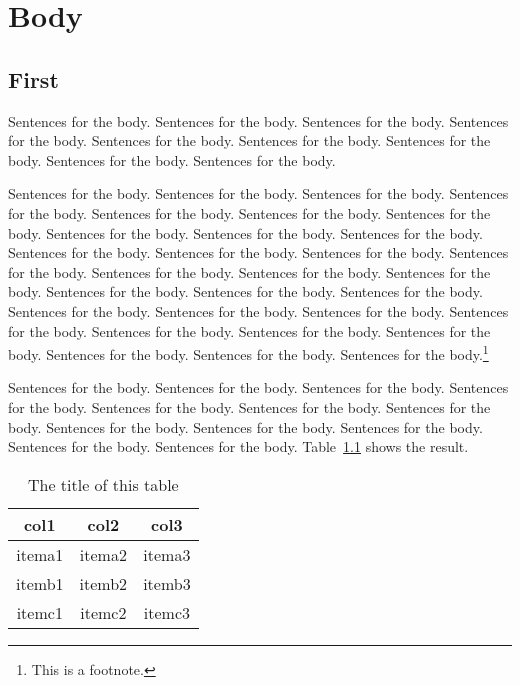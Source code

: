 \chapter{Body}

\section{First}

Sentences for the body.  Sentences for the body.  Sentences for the body.
Sentences for the body.  Sentences for the body.  Sentences for the body.
Sentences for the body.  Sentences for the body.  Sentences for the body.

Sentences for the body.  Sentences for the body.  Sentences for the body.
Sentences for the body.  Sentences for the body.  Sentences for the body.
Sentences for the body.  Sentences for the body.  Sentences for the body.
Sentences for the body.  Sentences for the body.  Sentences for the body.
Sentences for the body.  Sentences for the body.  Sentences for the body.
Sentences for the body.  Sentences for the body.  Sentences for the body.
Sentences for the body.  Sentences for the body.  Sentences for the body.
Sentences for the body.  Sentences for the body.  Sentences for the body.
Sentences for the body.  Sentences for the body.  Sentences for the body.
Sentences for the body.  Sentences for the body.  Sentences for the body.\footnote{
This is a footnote.}


Sentences for the body.  Sentences for the body.  Sentences for the body.
Sentences for the body.  Sentences for the body.  Sentences for the body.
Sentences for the body.  Sentences for the body.  Sentences for the body.
Sentences for the body.  Sentences for the body.  Sentences for the body.
Table~\ref{table:sample} shows the result.

\begin{table}[btp]
 \caption{\label{table:sample}The title of this table}
 \begin{center}
  \begin{tabular}{ccc}
   \hline
   col1 & col2 & col3 \\
   \hline
   itema1 & itema2 & itema3 \\
   itemb1 & itemb2 & itemb3 \\
   itemc1 & itemc2 & itemc3 \\
   \hline
  \end{tabular} 
 \end{center}
\end{table}

